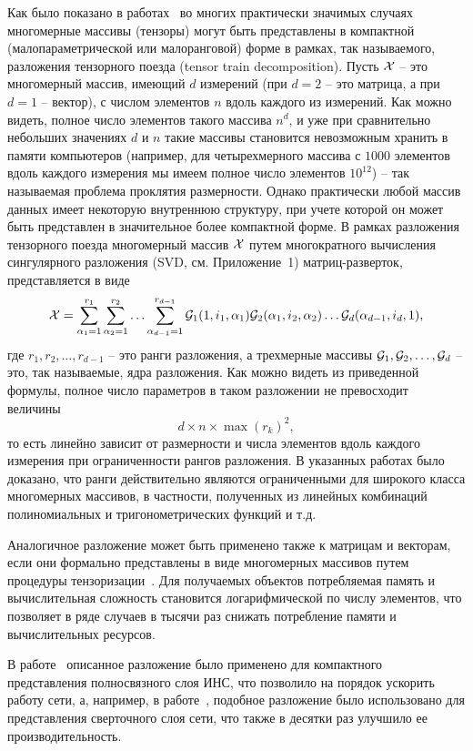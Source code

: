 \documentclass[a4paper,12pt,russian]{article} %
\begin{document}
Как было показано в работах~\cite{oseledets2010tt, oseledets2011tensor, savostyanov2011fast} во многих практически значимых случаях многомерные массивы (тензоры) могут быть представлены в компактной (малопараметрической или малоранговой) форме в рамках, так называемого, разложения тензорного поезда (tensor train decomposition).
Пусть $\mathcal{X}$ -- это многомерный массив, имеющий $d$ измерений (при $d=2$ -- это матрица, а при $d=1$ -- вектор), с числом элементов $n$ вдоль каждого из измерений.
Как можно видеть, полное число элементов такого массива $n^d$, и уже при сравнительно небольших значениях $d$ и $n$ такие массивы становится невозможным хранить в памяти компьютеров (например, для четырехмерного массива с $1000$ элементов вдоль каждого измерения мы имеем полное число элементов $10^{12}$) -- так называемая проблема проклятия размерности.
Однако практически любой массив данных имеет некоторую внутреннюю структуру, при учете которой он может быть представлен в значительное более компактной форме.
В рамках разложения тензорного поезда многомерный массив $\mathcal{X}$ путем многократного вычисления сингулярного разложения (SVD, см. Приложение~1) матриц-разверток, представляется в виде
$$
	\mathcal{X} = \sum_{\alpha_1=1}^{r_1}  \sum_{\alpha_2=1}^{r_2} \ldots  \sum_{\alpha_{d-1}=1}^{r_{d-1}}
		\mathcal{G}_1 (1, i_1, \alpha_1)
		\mathcal{G}_2 ( \alpha_1, i_2, \alpha_2)
		\ldots
		\mathcal{G}_d ( \alpha_{d-1}, i_d, 1),
$$
где $r_1, r_2, \ldots, r_{d-1}$ -- это ранги разложения, а трехмерные массивы $\mathcal{G}_1, \mathcal{G}_2, \ldots, \mathcal{G}_d$ -- это, так называемые, ядра разложения.
Как можно видеть из приведенной формулы, полное число параметров в таком разложении не превосходит величины 
$$
	d \times n \times \max(r_k)^2,
$$
то есть линейно зависит от размерности и числа элементов вдоль каждого измерения при ограниченности рангов разложения.
В указанных работах было доказано, что ранги действительно являются ограниченными для широкого класса многомерных массивов, в частности, полученных из линейных комбинаций полиномиальных и тригонометрических функций и т.д.

Аналогичное разложение может быть применено также к матрицам и векторам, если они формально представлены в виде многомерных массивов путем процедуры тензоризации~\cite{oseledets2010approximation}. Для получаемых объектов потребляемая память и вычислительная сложность становится логарифмической по числу элементов, что позволяет в ряде случаев в тысячи раз снижать потребление памяти и вычислительных ресурсов.

В работе~\cite{novikov2015tensorizing} описанное разложение было применено для компактного представления полносвязного слоя ИНС, что позволило на порядок ускорить работу сети, а, например, в работе~\cite{lebedev2014speeding}, подобное разложение было использовано для представления сверточного слоя сети, что также в десятки раз улучшило ее производительность.
\end{document}
